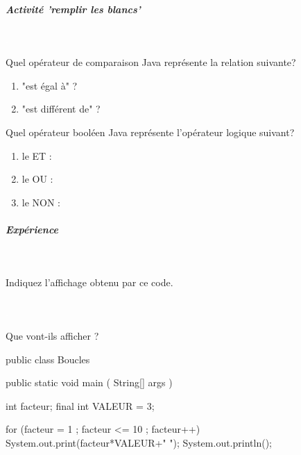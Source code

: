 \documentclass[11pt,a4paper]{article}
\begin{document}
			
		\subparagraph{Activit\'e 'remplir les blancs'} 
		
                \textcolor{white}{.} \par
            
								Quel op\'erateur de comparaison Java repr\'esente la relation suivante? 
							
            \par
        
					\begin{enumerate}
				
			\item "est \'egal \`a" ?                      \textcolor{gray}{\underline{\hspace*{2em}}} 
			\item "est diff\'erent de" ?                \textcolor{gray}{\underline{\hspace*{2em}}} 
					\end{enumerate}
				
								Quel op\'erateur bool\'een Java repr\'esente l'op\'erateur logique suivant? 
							
            \par
        
					\begin{enumerate}
				
			\item le ET :   \textcolor{gray}{\underline{\hspace*{2em}}} 
			\item le OU :   \textcolor{gray}{\underline{\hspace*{2em}}} 
			\item le NON :  \textcolor{gray}{\underline{\hspace*{1em}}} 
					\end{enumerate}
				
			
		\subparagraph{Exp\'erience} 
		
					\textcolor{white}{.} \par
				
					Indiquez l'affichage obtenu par ce code.
				
            \par
        
			
		\subparagraph{} 
		
                \textcolor{white}{.} \par
            
							  Que vont-ils afficher ?
              \begin{Java}
public class Boucles {

	public static void main ( String[] args ) {
		int facteur;
		final int VALEUR = 3;
	
		for (facteur = 1 ; facteur <= 10 ; facteur++){		
			System.out.print(facteur*VALEUR+" ");
		}
		System.out.println();
	}
}			\end{Java} \textcolor{gray}{\underline{\hspace*{16em}}} 
			
\end{document}

